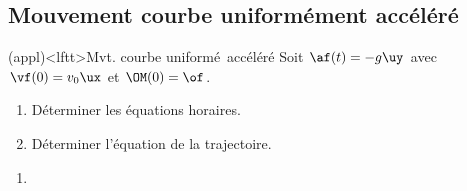 \documentclass[../../main/main.tex]{subfiles}
\begin{document}
\subsection{Mouvement courbe uniformément accéléré}
\begin{tcb*}(appl)<lftt>{Mvt. courbe uniformé\mnt\ accéléré}
	Soit $\af(t) = -g\uy$ avec $\vf(0) = v_0\ux$ et $\OM(0) = \of$.
	\begin{enumerate}[label=\sqenumi]
		\item Déterminer les équations horaires.
		\item Déterminer l'équation de la trajectoire.
	\end{enumerate}
	\tcblower
		\begin{enumerate}[label=\sqenumi]
			\item
        \vspace{-15pt}
			      \begin{isd}
				      \begin{center}
\end{center}
\end{isd}
\end{enumerate}
\end{tcb*}
\end{document}
